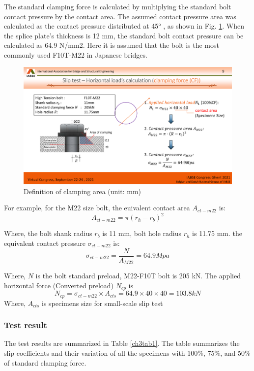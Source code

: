 The standard clamping force is calculated by multiplying the standard bolt contact pressure by the contact area. The assumed contact pressure area was calculated as the contact pressure distributed at 45° \cite{rotscher1927maschinenelemente}, as shown in Fig. \ref{ch3fig8}. When the splice plate's thickness is 12 mm, the standard bolt contact pressure can be calculated as 64.9 N/mm2. Here it is assumed that the bolt is the most commonly used F10T-M22 in Japanese bridges.


\begin{figure}[htbp]
\centering
\includegraphics[width=0.65\linewidth]{imgs/ch3/fig8.pdf}
\caption{Definition of clamping area (unit: mm)}
\label{ch3fig8}  
\end{figure}

For example, for the M22 size bolt, the euivalent contact area $A_{ct-m22}$ is:
\begin{equation*}
    A_{ct-m22} = \pi (r_h-r_b)^2
\end{equation*}

Where, the  bolt shank radius $r_b$ is 11 mm, bolt hole radius $r_h$ is 11.75 mm.
the equivalent contact pressure $\sigma_{ct-m22}$ is:
\begin{equation*}
    \sigma_{ct-m22} = \frac{N}{A_{M22}} = 64.9 Mpa
\end{equation*}

Where, $N$ is the bolt standard preload, M22-F10T bolt is 205 kN.
The applied horizontal force (Converted preload) $N_{cp}$ is 
\begin{equation*}
    N_{cp} = \sigma_{ct-m22} \times A_{cts} =64.9 \times 40 \times 40 = 103.8 kN
\end{equation*}
Where, $A_{cts}$ is specimens size for small-scale slip test


\subsubsection{Test result}

The test results are summarized in Table \ref{ch3tab1}. The table summarizes the slip coefficients and their variation of all the specimens with 100\%, 75\%, and 50\% of standard clamping force.

